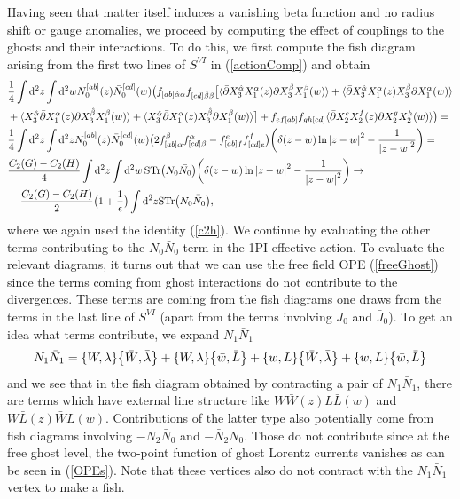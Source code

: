 \documentclass[12pt]{article}
\def\be{\begin{equation}}
\def\ee{\end{equation}}
\numberwithin{equation}{section}
\newcommand{\h}[1]{\hat{#1}}
\begin{document}
Having seen that matter itself induces a vanishing beta function and no radius shift or gauge anomalies, we proceed by computing the effect of couplings to the ghosts and their interactions. To do this, we first compute the fish diagram arising from the first two lines of $S^{VI}$ in (\ref{actionComp}) and obtain
\be
\begin{aligned}
	&\frac{1}{4}\int \dd^2 z \int \dd^2 w N_0^{[ab]}(z) \bar{N}_0^{[cd]}(w) \big(f_{[ab]\h{\alpha}\alpha} f_{[cd] \h{\beta}\beta} \big[ \langle \bar{\partial} X_3^{\h{\alpha}} X_1^\alpha(z) \partial X_3^{\h{\beta}} X_1^\beta(w) \rangle + \langle \bar{\partial} X_3^{\h{\alpha}} X_1^\alpha(z) X_3^{\h{\beta}} \partial X_1^\alpha(w) \rangle \\
	&+ \langle X_3^{\h{\alpha}} \bar{\partial} X_1^\alpha(z) \partial X_3^{\h{\beta}} X_1^\beta(w)\rangle + \langle X_3^{\h{\alpha}} \bar{\partial} X_1^\alpha(z) X_3^{\h{\beta}} \partial X_1^\beta(w)\rangle\big] + f_{ef[ab]}f_{gh[cd]} \langle \bar{\partial} X_2^e X_2^f(z) \partial X_2^g X_2^h (w)\rangle \big) = \\
	&\frac{1}{4}\int \dd^2 z \int \dd^2z N_0^{[ab]}(z) \bar{N}_0^{[cd]}(w)\big(2 f_{[ab]\alpha}^\beta f^\alpha_{[cd]\beta} - f^e_{[ab]f} f^f_{[cd]e}\big)\biggr(\delta(z-w)\ln\abs{z-w}^2 - \frac{1}{\abs{z-w}^2}\biggr)= \\
	&\frac{C_2(G)-C_2(H)}{4} \int \dd^2 z \int \dd^2 w \, \text{STr} \big(N_0 \bar{N_0}\big) \biggr(\delta(z-w)\ln\abs{z-w}^2 - \frac{1}{\abs{z-w}^2}\biggr) \to \\
	&-\frac{C_2(G) - C_2(H)}{2} \big(1+\frac{1}{\epsilon}\big) \int \dd^2 z \text{STr}\big(N_0 \bar{N}_0\big),
\end{aligned}
\ee
where we again used the identity (\ref{c2h}). We continue by evaluating the other terms contributing to the $N_0 \bar{N}_0$ term in the 1PI effective action. To evaluate the relevant diagrams, it turns out that we can use the free field OPE (\ref{freeGhost}) since the terms coming from ghost interactions do not contribute to the divergences.
These terms are coming from the fish diagrams one draws from the terms in the last line of $S^{VI}$ (apart from the terms involving $J_0$ and $\bar{J}_0$). To get an idea what terms contribute, we expand $N_1 \bar{N}_1$
\be
N_1 \bar{N}_1 = \acomm{W}{\lambda} \acomm{\bar{W}}{\bar{\lambda}} + \acomm{W}{\lambda}\acomm{\bar{w}}{\bar{L}} + \acomm{w}{L}\acomm{\bar{W}}{\bar{\lambda}} + \acomm{w}{L} \acomm{\bar{w}}{\bar{L}}
\ee
and we see that in the fish diagram obtained by contracting a pair of $N_1 \bar{N}_1$, there are terms which have external line structure like $W \bar{W}(z) L \bar{L}(w)$ and $W \bar{L}(z) \bar{W}{L}(w)$. Contributions of the latter type also potentially come from fish diagrams involving $-N_2 \bar{N}_0$ and $-\bar{N}_2 N_0$. Those do not contribute since at the free ghost level, the two-point function of ghost Lorentz currents vanishes as can be seen in (\ref{OPEs}). Note that these vertices also do not contract with the $N_1 \bar{N}_1$ vertex to make a fish.
\end{document}
